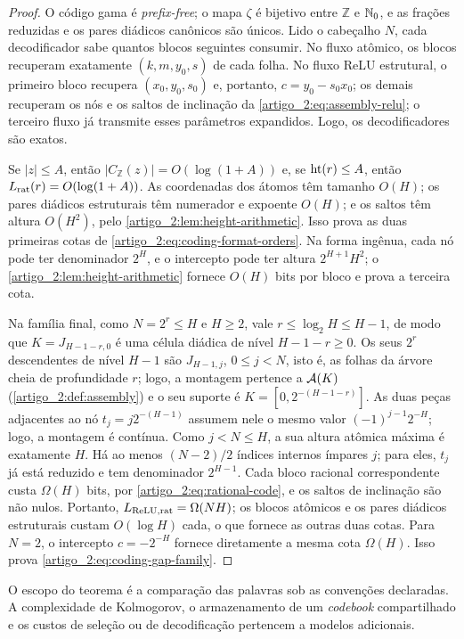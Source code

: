 \begin{proof}
O código gama é \emph{prefix-free}; o mapa $\zeta$ é bijetivo entre $\mathbb Z$ e
$\mathbb{N}_0$, e as frações reduzidas e os pares diádicos canônicos são únicos. Lido o
cabeçalho $N$, cada decodificador sabe quantos blocos seguintes consumir. No
fluxo atômico, os blocos recuperam exatamente $(k,m,y_0,s)$ de cada folha. No
fluxo ReLU estrutural, o primeiro bloco recupera $(x_0,y_0,s_0)$ e, portanto,
$c=y_0-s_0x_0$; os demais recuperam os nós e os saltos de inclinação da
\cref{artigo_2:eq:assembly-relu}; o terceiro fluxo já transmite esses parâmetros
expandidos. Logo, os decodificadores são exatos.

Se $|z|\le A$, então $|C_{\mathbb Z}(z)|=O(\log(1+A))$ e, se
$\operatorname{ht}(r)\le A$, então $L_{\rm rat}(r)=O(\log(1+A))$. As coordenadas dos
átomos têm tamanho $O(H)$; os pares diádicos estruturais têm numerador e
expoente $O(H)$; e os saltos têm altura $O(H^2)$, pelo
\cref{artigo_2:lem:height-arithmetic}. Isso prova as duas primeiras cotas de
\eqref{artigo_2:eq:coding-format-orders}. Na forma ingênua, cada nó pode ter
denominador $2^H$, e o intercepto pode ter altura $2^{H+1}H^2$; o
\cref{artigo_2:lem:height-arithmetic} fornece $O(H)$ bits por bloco e prova a terceira cota.

Na família final, como $N=2^r\le H$ e $H\ge2$, vale $r\le\log_2H\le H-1$, de
modo que $K=J_{H-1-r,0}$ é uma célula diádica de nível $H-1-r\ge0$. Os seus
$2^r$ descendentes de nível $H-1$ são $J_{H-1,j}$, $0\le j<N$, isto é, as
folhas da árvore cheia de profundidade $r$; logo, a montagem pertence a
$\mathcal{A}(K)$ (\cref{artigo_2:def:assembly}) e o seu suporte é $K=[0,2^{-(H-1-r)}]$.
As duas peças adjacentes ao nó
$t_j=j2^{-(H-1)}$ assumem nele o mesmo valor
$(-1)^{j-1}2^{-H}$; logo, a montagem é contínua. Como $j<N\le H$, a sua altura
atômica máxima é exatamente $H$. Há ao menos $(N-2)/2$ índices internos
ímpares $j$; para eles, $t_j$ já está reduzido e tem denominador
$2^{H-1}$. Cada bloco racional correspondente custa $\Omega(H)$ bits, por
\eqref{artigo_2:eq:rational-code}, e os saltos de inclinação são não nulos. Portanto,
$L_{\rm ReLU,rat}=\Omega(NH)$; os blocos atômicos e os pares diádicos
estruturais custam $O(\log H)$ cada, o que fornece as outras duas cotas. Para $N=2$,
o intercepto $c=-2^{-H}$ fornece diretamente a mesma cota $\Omega(H)$.
Isso prova \eqref{artigo_2:eq:coding-gap-family}.
\end{proof}

O escopo do teorema é a comparação das palavras sob as convenções declaradas.
A complexidade de Kolmogorov, o armazenamento de um \emph{codebook} compartilhado e
os custos de seleção ou de decodificação pertencem a modelos adicionais.

